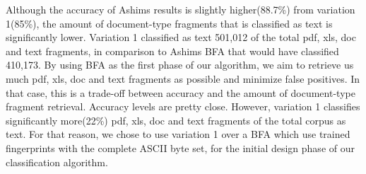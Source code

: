  Although the accuracy of Ashims results is slightly higher(88.7\%) from variation 1(85\%), the amount of document-type fragments that is classified as text is significantly lower. Variation 1 classified as text 501,012 of the total pdf, xls, doc and text fragments, in comparison to Ashims BFA that would have classified 410,173. By using BFA as the first phase of our algorithm, we aim to retrieve us much pdf, xls, doc and text fragments as possible and minimize false positives. In that case, this is a trade-off between accuracy and the amount of document-type fragment retrieval. Accuracy levels are pretty close. However, variation 1 classifies significantly more(22\%) pdf, xls, doc and text fragments of the total corpus as text. For that reason, we chose to use variation 1 over a BFA which use trained fingerprints with the complete ASCII byte set, for the initial design phase of our classification algorithm.
 
 


